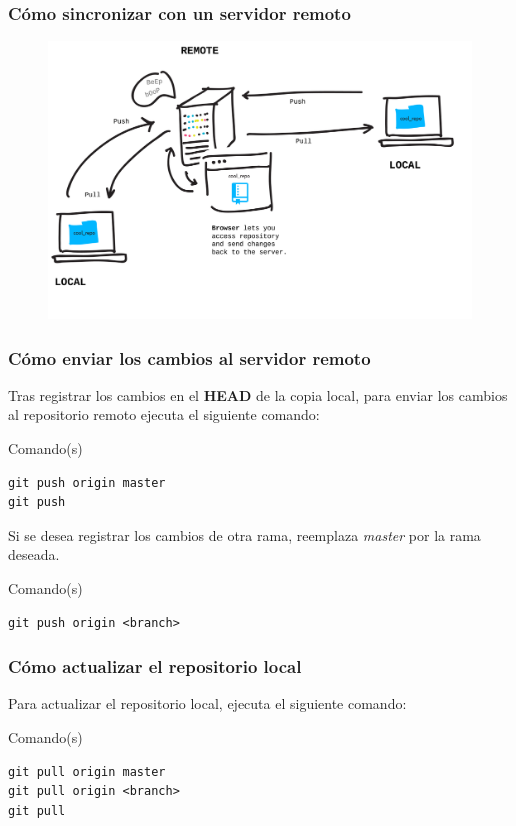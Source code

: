 \documentclass{beamer}
\begin{document}
\begin{frame}
\frametitle{Cómo sincronizar con un servidor remoto}
\begin{figure}
\includegraphics[width=0.95\linewidth]{remote.png}
\end{figure}
\end{frame}

\begin{frame}[fragile]
\frametitle{Cómo enviar los cambios al servidor remoto}
Tras registrar los cambios en el \textbf{HEAD} de la copia local, para enviar los cambios al repositorio remoto ejecuta el siguiente comando:
\begin{block}{Comando(s)}
\begin{verbatim}
git push origin master
git push
\end{verbatim}
\end{block}
\vskip 1.00cm
Si se desea registrar los cambios de otra rama, reemplaza \textit{master} por la rama deseada.
\begin{block}{Comando(s)}
\begin{verbatim}
git push origin <branch>
\end{verbatim}
\end{block}
\end{frame}

\begin{frame}[fragile]
\frametitle{Cómo actualizar el repositorio local}
Para actualizar el repositorio local, ejecuta el siguiente comando:
\begin{block}{Comando(s)}
\begin{verbatim}
git pull origin master
git pull origin <branch>
git pull
\end{verbatim}
\end{block}
\end{frame}
\end{document}
